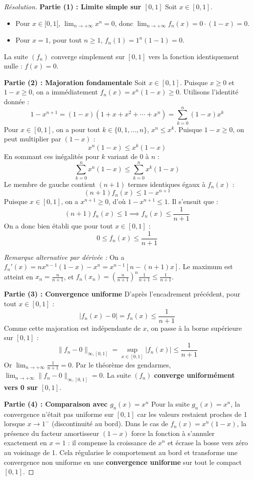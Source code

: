 \documentclass[12pt,a4paper]{report}
\begin{document}
\begin{proof}[Résolution]
\textbf{Partie (1) : Limite simple sur $[0, 1]$}
Soit $x \in [0, 1]$.
\begin{itemize}
    \item Pour $x \in [0, 1[$, $\lim_{n \to +\infty} x^n = 0$, donc $\lim_{n \to +\infty} f_n(x) = 0 \cdot (1-x) = 0$.
    \item Pour $x = 1$, pour tout $n \ge 1$, $f_n(1) = 1^n (1-1) = 0$.
\end{itemize}
La suite $(f_n)$ converge simplement sur $[0, 1]$ vers la fonction identiquement nulle : $f(x) = 0$.

\textbf{Partie (2) : Majoration fondamentale}
Soit $x \in [0, 1]$. Puisque $x \ge 0$ et $1-x \ge 0$, on a immédiatement $f_n(x) = x^n(1-x) \ge 0$.
Utilisons l'identité donnée :
\[ 1 - x^{n+1} = (1-x)(1 + x + x^2 + \cdots + x^n) = \sum_{k=0}^n (1-x)x^k \]
Pour $x \in [0, 1]$, on a pour tout $k \in \{0, 1, \dots, n\}$, $x^n \le x^k$.
Puisque $1-x \ge 0$, on peut multiplier par $(1-x)$ :
\[ x^n (1-x) \le x^k (1-x) \]
En sommant ces inégalités pour $k$ variant de $0$ à $n$ :
\[ \sum_{k=0}^n x^n(1-x) \le \sum_{k=0}^n x^k(1-x) \]
Le membre de gauche contient $(n+1)$ termes identiques égaux à $f_n(x)$ :
\[ (n+1) f_n(x) \le 1 - x^{n+1} \]
Puisque $x \in [0, 1]$, on a $x^{n+1} \ge 0$, d'où $1 - x^{n+1} \le 1$. Il s'ensuit que :
\[ (n+1) f_n(x) \le 1 \implies f_n(x) \le \frac{1}{n+1} \]
On a donc bien établi que pour tout $x \in [0, 1]$ :
\[ 0 \le f_n(x) \le \frac{1}{n+1} \]

\textit{Remarque alternative par dérivée :} On a $f_n'(x) = n x^{n-1}(1-x) - x^n = x^{n-1}[n - (n+1)x]$. Le maximum est atteint en $x_n = \frac{n}{n+1}$, et $f_n(x_n) = \left(\frac{n}{n+1}\right)^n \frac{1}{n+1} \le \frac{1}{n+1}$.

\textbf{Partie (3) : Convergence uniforme}
D'après l'encadrement précédent, pour tout $x \in [0, 1]$ :
\[ |f_n(x) - 0| = f_n(x) \le \frac{1}{n+1} \]
Comme cette majoration est indépendante de $x$, on passe à la borne supérieure sur $[0, 1]$ :
\[ \|f_n - 0\|_{\infty, [0, 1]} = \sup_{x \in [0, 1]} |f_n(x)| \le \frac{1}{n+1} \]
Or $\lim_{n \to +\infty} \frac{1}{n+1} = 0$.
Par le théorème des gendarmes, $\lim_{n \to +\infty} \|f_n - 0\|_{\infty, [0, 1]} = 0$.
La suite $(f_n)$ \textbf{converge uniformément vers 0 sur $[0, 1]$}.

\textbf{Partie (4) : Comparaison avec $g_n(x) = x^n$}
Pour la suite $g_n(x) = x^n$, la convergence n'était pas uniforme sur $[0, 1]$ car les valeurs restaient proches de 1 lorsque $x \to 1^-$ (discontinuité au bord).
Dans le cas de $f_n(x) = x^n(1-x)$, la présence du facteur amortisseur $(1-x)$ force la fonction à s'annuler exactement en $x=1$ : il compense la croissance de $x^n$ et écrase la bosse vers zéro au voisinage de 1. Cela régularise le comportement au bord et transforme une convergence non uniforme en une \textbf{convergence uniforme} sur tout le compact $[0, 1]$.
\end{proof}
\end{document}
